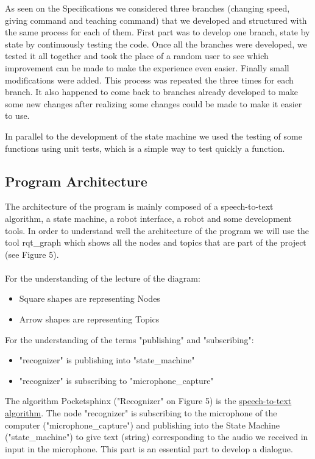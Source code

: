 As seen on the Specifications we considered three branches (changing speed, giving command and teaching command) that we developed and structured with the same process for each of them. First part was to develop one branch, state by state by continuously testing the code. Once all the branches were developed, we tested it all together and took the place of a random user to see which improvement can be made to make the experience even easier. Finally small modifications were added. This process was repeated the three times for each branch. It also happened to come back to branches already developed to make some new changes after realizing some changes could be made to make it easier to use.

In parallel to the development of the state machine we used the testing of some functions using unit tests, which is a simple way to test quickly a function.

\subsection{Program Architecture}
The architecture of the program is mainly composed of a speech-to-text algorithm, a state machine, a robot interface, a robot and some development tools. In order to understand well the architecture of the program we will use the tool rqt\_graph which shows all the nodes and topics that are part of the project (see Figure 5).\\
\\
For the understanding of the lecture of the diagram:
\begin{itemize}
  \item Square shapes are representing Nodes
  \item Arrow  shapes are representing Topics
\end{itemize} \hfill \linebreak
For the understanding of the terms "publishing" and "subscribing":
\begin{itemize}
  \item "recognizer" is publishing into "state\_machine"
  \item "recognizer" is subscribing to "microphone\_capture"
\end{itemize}\hfill \linebreak
The algorithm Pocketsphinx ("Recognizer" on Figure 5) is the \underline{speech-to-text algorithm}. The node "recognizer" is subscribing to the microphone of the computer \linebreak ("microphone\_capture") and publishing into the State Machine ("state\_machine") to give text (string) corresponding to the audio we received in input in the microphone. This part is an essential part to develop a dialogue.


